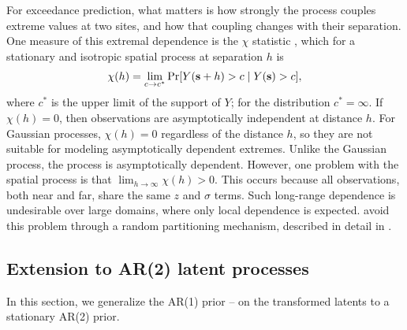 \documentclass[12pt]{article}
\begin{document}
For exceedance prediction, what matters is how strongly the \skewt process couples extreme values at two sites, and how that coupling changes with their separation.
One measure of this extremal dependence is the $\chi$ statistic \parencite{Coles1999}, which for a stationary and isotropic spatial process at separation $h$ is
\begin{align} \label{eq:chih}
  \chi(h) = \lim_{c \rightarrow c^*} \Pr[Y(\mbox{\bf s} + h) > c \mid Y(\mbox{\bf s}) > c],
\end{align}
where $c^*$ is the upper limit of the support of $Y$; for the \skewt distribution $c^* = \infty$.
If $\chi(h) = 0$, then observations are asymptotically independent at distance $h$.
For Gaussian processes, $\chi(h) = 0$ regardless of the distance $h$, so they are not suitable for modeling asymptotically dependent extremes.
Unlike the Gaussian process, the \skewt process is asymptotically dependent.
However, one problem with the spatial \skewt process is that $\lim_{h \rightarrow \infty} \chi(h) > 0$.
This occurs because all observations, both near and far, share the same $z$ and $\sigma$ terms.
Such long-range dependence is undesirable over large domains, where only local dependence is expected.
\textcite{morris_space-time_2017} avoid this problem through a random partitioning mechanism, described in detail in .

\subsection{Extension to AR(2) latent processes}\label{sec:ar2}

In this section, we generalize the AR(1) prior -- on the transformed latents to a stationary AR(2) prior.
\end{document}
